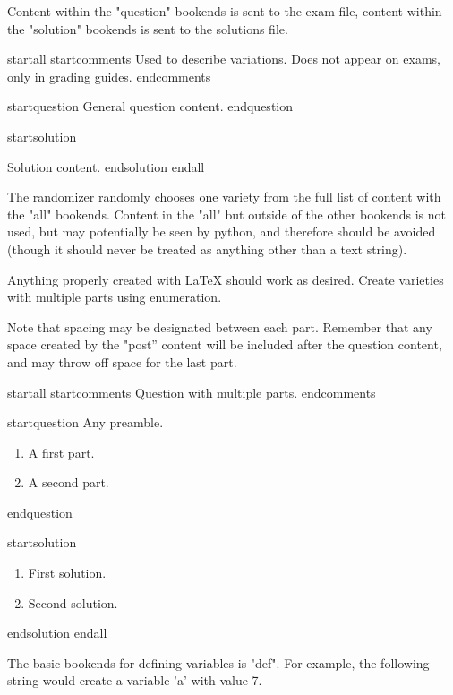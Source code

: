 Content within the "question" bookends is sent to the exam file, content within the "solution" bookends is sent to the solutions file.

startall
startcomments
Used to describe variations. Does not appear on exams, only in grading guides.
endcomments

startquestion General question content.
endquestion

startsolution
\item Solution content.
endsolution
endall




The randomizer randomly chooses one variety from the full list of content with the "all" bookends. Content in the "all" but outside of the other bookends is not used, but may potentially be seen by python, and therefore should be avoided (though it should never be treated as anything other than a text string).

Anything properly created with LaTeX should work as desired. Create varieties with multiple parts using enumeration.

Note that spacing may be designated between each part. Remember that any space created by the "post'' content will be included after the question content, and may throw off space for the last part.

startall
startcomments 
Question with multiple parts.
endcomments

startquestion Any preamble. \begin{enumerate}
\item A first part. \vspace{2cm}
\item A second part.
\end{enumerate}
endquestion

startsolution
\item \begin{enumerate}
\item First solution.
\item Second solution.
\end{enumerate}
endsolution
endall





The basic bookends for defining variables is "def". For example, the following string would create a variable 'a' with value 7.

